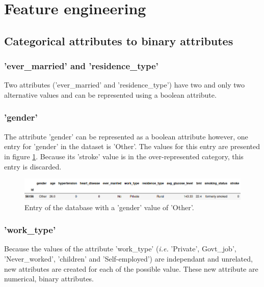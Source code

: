 \section{Feature engineering}
\label{section_feature_engineering}
\subsection{Categorical attributes to binary attributes}

\subsubsection{'ever\_married' and 'residence\_type'}
Two attributes ('ever\_married' and 'residence\_type') have two and only two alternative values and 
can be represented using a boolean attribute.\\

\subsubsection{'gender'}
The attribute 'gender' can be represented as a boolean attribute however, one entry for 
'gender' in the dataset is 'Other'. The values for this entry are presented in figure 
\ref{figure_gender_other}. Because its 'stroke' value is in the over-represented category, this entry 
is discarded.\\

\begin{figure}[H]
\centering
\includegraphics[scale=0.5]{figures/dataset_gender_other.png}
\caption{Entry of the database with a 'gender' value of 'Other'.}
\label{figure_gender_other}
\end{figure}

\subsubsection{'work\_type'}
Because the values of the attribute 'work\_type' (\textit{i.e.} 'Private', Govt\_job', 
'Never\_worked', 'children' and 'Self-employed') are independant and unrelated, new attributes are 
created for each of the possible value. These new attribute are numerical, binary attributes. 
 
